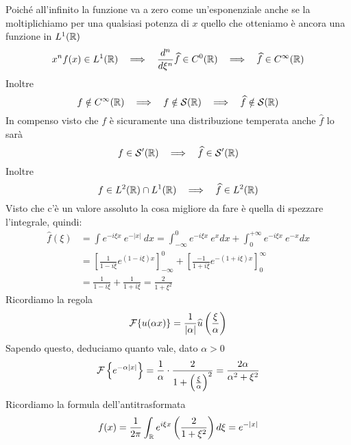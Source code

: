 Poiché all'infinito la funzione va a zero come un'esponenziale anche se la moltiplichiamo per una qualsiasi potenza di $x$ quello che otteniamo è ancora una funzione in $L^{1} (\mathbb{R})$
\begin{equation*}
x^{n} f(x)\in L^{1} (\RR)\ \ \implies \ \ \frac{d^{n}}{d\xi^{n}}\hat{f} \in C^{0}(\RR) \ \ \implies \ \ \hat{f} \in C^{\infty} (\RR)
\end{equation*}
Inoltre
\begin{equation*}
f\notin C^{\infty} (\mathbb{R})\ \ \implies \ \ f\notin \mathcal{S} (\mathbb{R}) \ \ \implies \ \ \widehat{f} \notin \mathcal{S} (\mathbb{R})
\end{equation*}
In compenso visto che $f$ è sicuramente una distribuzione temperata anche $\hat{f}$ lo sarà
\begin{equation*}
f\in \Sc  '(\RR) \ \ \implies \ \ \hat{f} \in \Sc  '(\RR)
\end{equation*}
Inoltre
\begin{equation*}
f\in L^{2}(\RR) \cap L^{1}(\RR) \ \ \implies \ \ \hat{f} \in L^{2}(\RR)
\end{equation*}
Visto che c'è un valore assoluto la cosa migliore da fare è quella di spezzare l'integrale, quindi:
\begin{equation*}
\begin{aligned}
\hat{f} (\xi) & = \int e^{- i\xi x} \ e^{- |x|} \ dx = \int^{0}_{- \infty} e^{- i\xi x} \ e^{x} dx + \int^{+ \infty}_{0} e^{- i\xi x} \ e^{- x} dx\\
 & = \left[\frac{1}{1 - i\xi} e^{(1 - i\xi) x}\right]^{0}_{- \infty} + \left[\frac{- 1}{1 + i\xi} e^{- (1 + i\xi) x}\right]^{\infty}_{0}\\
 & = \frac{1}{1 - i\xi} + \frac{1}{1 + i\xi} = \frac{2}{1 + \xi^{2}}
\end{aligned}
\end{equation*}
Ricordiamo la regola
\begin{equation*}
\mathcal{F} \{u(\alpha x)\} = \frac{1}{| \alpha |}\widehat{u}\left(\frac{\xi}{\alpha}\right)
\end{equation*}
Sapendo questo, deduciamo quanto vale, dato $\alpha  > 0$
\begin{equation*}
\mathcal{F} \left\{e^{- \alpha | x|}\right\} = \frac{1}{\alpha} \cdot \frac{2}{1 + \left(\frac{\xi}{\alpha}\right)^{2}} = \frac{2\alpha}{\alpha^{2} + \xi^{2}}
\end{equation*}
Ricordiamo la formula dell'antitrasformata
\begin{equation*}
f(x) = \frac{1}{2\pi}\int_{\mathbb{R}} e^{i\xi x}\left(\frac{2}{1 + \xi^{2}}\right) d\xi = e^{- |x|}
\end{equation*}

